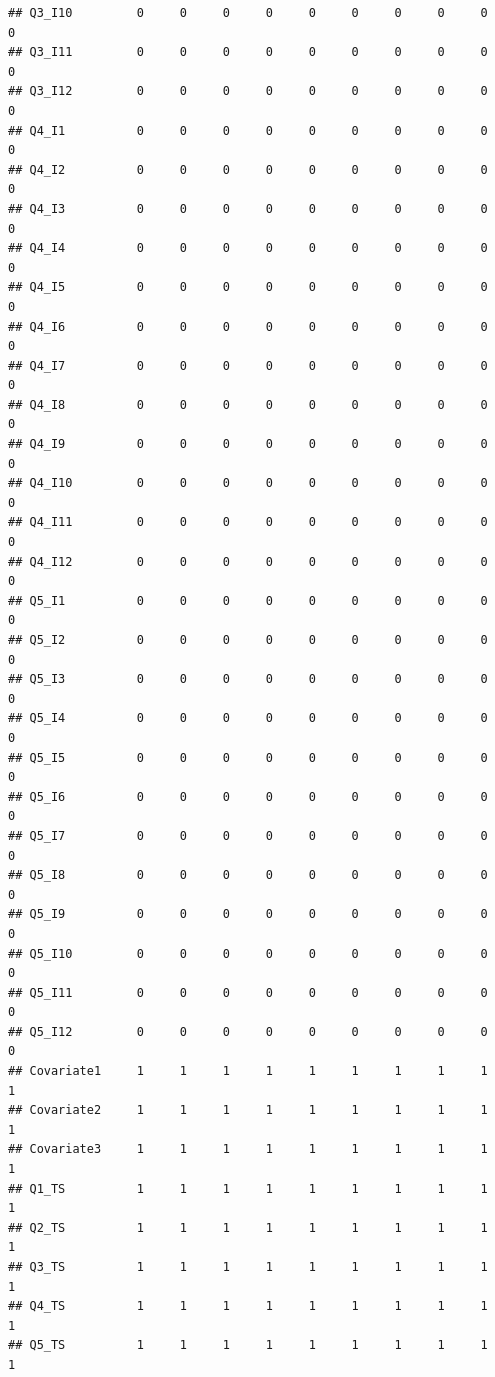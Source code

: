 \documentclass[]{book}
\begin{document}
\begin{verbatim}
## Q3_I10         0     0     0     0     0     0     0     0     0      0
## Q3_I11         0     0     0     0     0     0     0     0     0      0
## Q3_I12         0     0     0     0     0     0     0     0     0      0
## Q4_I1          0     0     0     0     0     0     0     0     0      0
## Q4_I2          0     0     0     0     0     0     0     0     0      0
## Q4_I3          0     0     0     0     0     0     0     0     0      0
## Q4_I4          0     0     0     0     0     0     0     0     0      0
## Q4_I5          0     0     0     0     0     0     0     0     0      0
## Q4_I6          0     0     0     0     0     0     0     0     0      0
## Q4_I7          0     0     0     0     0     0     0     0     0      0
## Q4_I8          0     0     0     0     0     0     0     0     0      0
## Q4_I9          0     0     0     0     0     0     0     0     0      0
## Q4_I10         0     0     0     0     0     0     0     0     0      0
## Q4_I11         0     0     0     0     0     0     0     0     0      0
## Q4_I12         0     0     0     0     0     0     0     0     0      0
## Q5_I1          0     0     0     0     0     0     0     0     0      0
## Q5_I2          0     0     0     0     0     0     0     0     0      0
## Q5_I3          0     0     0     0     0     0     0     0     0      0
## Q5_I4          0     0     0     0     0     0     0     0     0      0
## Q5_I5          0     0     0     0     0     0     0     0     0      0
## Q5_I6          0     0     0     0     0     0     0     0     0      0
## Q5_I7          0     0     0     0     0     0     0     0     0      0
## Q5_I8          0     0     0     0     0     0     0     0     0      0
## Q5_I9          0     0     0     0     0     0     0     0     0      0
## Q5_I10         0     0     0     0     0     0     0     0     0      0
## Q5_I11         0     0     0     0     0     0     0     0     0      0
## Q5_I12         0     0     0     0     0     0     0     0     0      0
## Covariate1     1     1     1     1     1     1     1     1     1      1
## Covariate2     1     1     1     1     1     1     1     1     1      1
## Covariate3     1     1     1     1     1     1     1     1     1      1
## Q1_TS          1     1     1     1     1     1     1     1     1      1
## Q2_TS          1     1     1     1     1     1     1     1     1      1
## Q3_TS          1     1     1     1     1     1     1     1     1      1
## Q4_TS          1     1     1     1     1     1     1     1     1      1
## Q5_TS          1     1     1     1     1     1     1     1     1      1

\end{verbatim}
\end{document}
